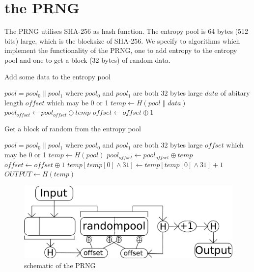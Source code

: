 \section{the PRNG}
The PRNG utilises SHA-256 as hash function.
The entropy pool is 64 bytes (512 bits) large, which is the blocksize of SHA-256.
We specify to algorithms which implement the functionality of the PRNG, one to add entropy to the entropy pool and one to get a block (32 bytes) of random data.
\begin{algorithm}
\caption{Add some data to the entropy pool}
\label{algAddEntropy}
\begin{algorithmic}
\REQUIRE $pool = pool_0 \parallel pool_1$ where $pool_0$ and $pool_1$ are both 32 bytes large
\REQUIRE $data$ of abitary length
\REQUIRE $offset$ which may be 0 or 1
\STATE $temp \leftarrow H(pool \parallel data)$
\STATE $pool_{offset} \leftarrow pool_{offset} \oplus temp$
\STATE $offset \leftarrow offset \oplus 1$
\end{algorithmic}
\end{algorithm}

\begin{algorithm}
\caption{Get a block of random from the entropy pool}
\label{algGetRandom}
\begin{algorithmic}
\REQUIRE $pool = pool_0 \parallel pool_1$ where $pool_0$ and $pool_1$ are both 32 bytes large
\REQUIRE $offset$ which may be 0 or 1
\STATE $temp \leftarrow H(pool)$
\STATE $pool_{offset} \leftarrow pool_{offset} \oplus temp$
\STATE $offset \leftarrow offset \oplus 1$
\STATE $temp[temp[0] \wedge 31] \leftarrow temp[temp[0] \wedge 31] + 1$
\STATE $OUTPUT \leftarrow H(temp)$
\end{algorithmic}
\end{algorithm}

\begin{figure}
\includegraphics[scale=0.3]{PRNG} 
\caption{schematic of the PRNG}
\end{figure}